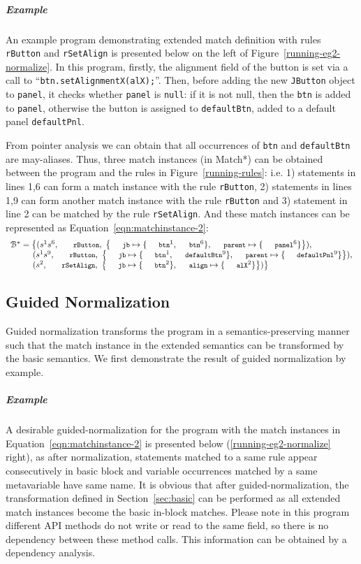 \documentclass[letterpaper, USenglish]{lipics-v2016}
\newcommand{\code}[1]{\texttt{\footnotesize #1}}
\theoremstyle{plain}
\begin{document}
\subparagraph*{Example} An example program demonstrating extended match
definition with rules \code{rButton} and \code{rSetAlign} is presented below on the left of Figure~\ref{running-eg2-normalize}. In this program, firstly, the alignment field of the button is set via a call to ``\code{btn.setAlignmentX(alX);}''. Then, before adding the new \code{JButton} object to \code{panel}, it  checks whether \code{panel} is \code{null}: if it is not {null}, then the \code{btn} is added to \code{panel}, otherwise the button is assigned to \code{defaultBtn}, added to a default panel \code{defaultPnl}. 

From pointer analysis we can obtain that all occurrences of \code{btn}
and \code{defaultBtn}
are may-aliases.
Thus, three match instances (in Match*) can be obtained between the program and the rules in Figure~\ref{running-rules}: i.e. 1) statements in lines 1,6 can form a match instance with the rule \code{rButton}, 2) statements in lines 1,9 can form another match instance with the rule \code{rButton} and 3) statement in line 2 can be matched by the rule \code{rSetAlign}. And these match instances can be represented as Equation~\ref{eqn:matchinstance-2}:
\begin{equation}
\label{eqn:matchinstance-2}
\begin{array}{l}
  \mathcal{B}^*=\big\{(s^1s^6,~\code{rButton},~\left\{\code{jb}\mapsto\{\code{btn}^1, \code{btn}^6\}, \code{parent}\mapsto\{\code{panel}^6\}\right\}),\\
  \quad\quad~~(s^1s^9,~\code{rButton},~\left\{\code{jb}\mapsto\{\code{btn}^1, \code{defaultBtn}^9\}, \code{parent}\mapsto\{\code{defaultPnl}^9\}\right\}),\\
  \quad\quad~~(s^2,~\code{rSetAlign},~\left\{\code{jb}\mapsto\{\code{btn}^2\}, \code{align}\mapsto\{\code{alX}^2\}\right\})\big\}
\end{array}
\end{equation}

\subsection{Guided Normalization}

Guided normalization transforms the program in a
semantics-preserving manner such that the match instance in the
extended semantics can be transformed by the basic semantics. We first
demonstrate the result of guided normalization by example.

\subparagraph*{Example} A desirable guided-normalization for the program with the match instances in
Equation~\ref{eqn:matchinstance-2} is presented below (\ref{running-eg2-normalize} right), as after
normalization, statements matched to a same rule appear consecutively
in basic block and variable occurrences matched by a same metavariable
have same name. It is obvious that after guided-normalization, the
transformation defined in Section~\ref{sec:basic} can be performed as
all extended match instances become the basic in-block matches.
Please note in this program different API methods do not write or read
to the same field, so there is no dependency between these method
calls. This information can be obtained by a dependency analysis.
\end{document}
